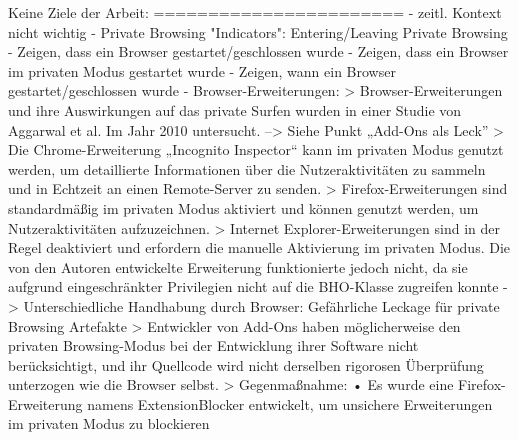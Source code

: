 Keine Ziele der Arbeit:
=======================
-	zeitl. Kontext nicht wichtig
- 	Private Browsing "Indicators": Entering/Leaving Private Browsing \cite{Ohana.2013}
-	Zeigen, dass ein Browser gestartet/geschlossen wurde
-	Zeigen, dass ein Browser im privaten Modus gestartet wurde
-	Zeigen, wann ein Browser gestartet/geschlossen wurde
- Browser-Erweiterungen: \cite{Satvat.2014}
	> Browser-Erweiterungen und ihre Auswirkungen auf das private Surfen wurden in einer Studie von Aggarwal et al. Im Jahr 2010 untersucht. --> Siehe Punkt „Add-Ons als Leck”
	> Die Chrome-Erweiterung „Incognito Inspector“ kann im privaten Modus genutzt werden, um detaillierte Informationen über die Nutzeraktivitäten zu sammeln und in Echtzeit an einen Remote-Server zu senden.
	> Firefox-Erweiterungen sind standardmäßig im privaten Modus aktiviert und können genutzt werden, um Nutzeraktivitäten aufzuzeichnen.
	> Internet Explorer-Erweiterungen sind in der Regel deaktiviert und erfordern die manuelle Aktivierung im privaten Modus. Die von den Autoren entwickelte Erweiterung funktionierte jedoch nicht, da sie aufgrund eingeschränkter Privilegien nicht auf die BHO-Klasse zugreifen konnte
- \cite{Aggarwal.2010}
	> Unterschiedliche Handhabung durch Browser: Gefährliche Leckage für private Browsing Artefakte
	> Entwickler von Add-Ons haben möglicherweise den privaten Browsing-Modus bei der Entwicklung ihrer Software nicht berücksichtigt, und ihr Quellcode wird nicht derselben rigorosen Überprüfung unterzogen wie die Browser selbst.
	> Gegenmaßnahme: \cite{Aggarwal.2010} 
		•	Es wurde eine Firefox-Erweiterung namens ExtensionBlocker entwickelt, um unsichere Erweiterungen im privaten Modus zu blockieren




